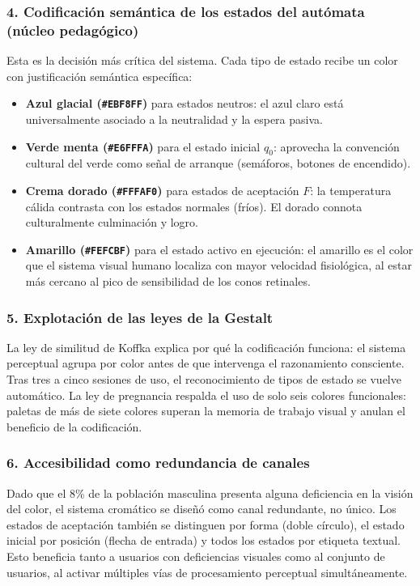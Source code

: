 \subsubsection*{4. Codificación semántica de los estados del autómata (núcleo pedagógico)}

Esta es la decisión más crítica del sistema. Cada tipo de estado recibe un color con justificación
semántica específica:

\begin{itemize}
    \item \textbf{Azul glacial (\texttt{\#EBF8FF})} para estados neutros: el azul claro está
    universalmente asociado a la neutralidad y la espera pasiva.
    \item \textbf{Verde menta (\texttt{\#E6FFFA})} para el estado inicial $q_0$: aprovecha la
    convención cultural del verde como señal de arranque (semáforos, botones de encendido).
    \item \textbf{Crema dorado (\texttt{\#FFFAF0})} para estados de aceptación $F$: la temperatura
    cálida contrasta con los estados normales (fríos). El dorado connota culturalmente culminación
    y logro.
    \item \textbf{Amarillo (\texttt{\#FEFCBF})} para el estado activo en ejecución: el amarillo es
    el color que el sistema visual humano localiza con mayor velocidad fisiológica, al estar más
    cercano al pico de sensibilidad de los conos retinales.
\end{itemize}

\subsubsection*{5. Explotación de las leyes de la Gestalt}

La ley de similitud de Koffka \cite{koffka2013} explica por qué la codificación funciona: el
sistema perceptual agrupa por color antes de que intervenga el razonamiento consciente. Tras tres a
cinco sesiones de uso, el reconocimiento de tipos de estado se vuelve automático. La ley de
pregnancia respalda el uso de solo seis colores funcionales: paletas de más de siete colores
superan la memoria de trabajo visual y anulan el beneficio de la codificación.

\subsubsection*{6. Accesibilidad como redundancia de canales}

Dado que el 8\% de la población masculina presenta alguna deficiencia en la visión del color, el
sistema cromático se diseñó como canal redundante, no único. Los estados de aceptación también se
distinguen por forma (doble círculo), el estado inicial por posición (flecha de entrada) y todos
los estados por etiqueta textual. Esto beneficia tanto a usuarios con deficiencias visuales como al
conjunto de usuarios, al activar múltiples vías de procesamiento perceptual simultáneamente.
